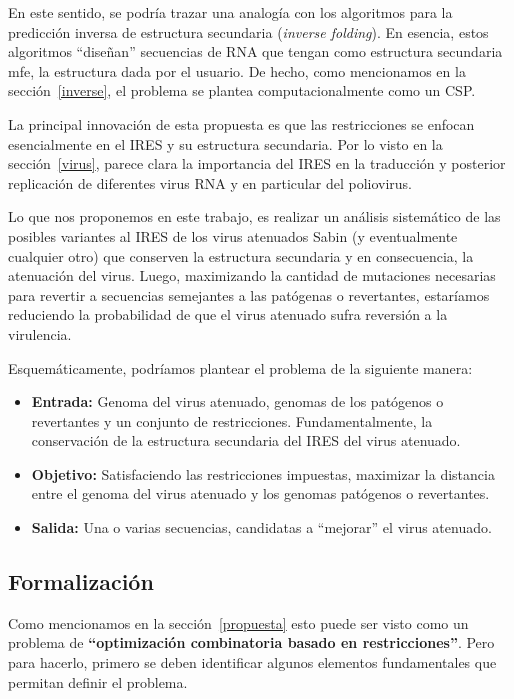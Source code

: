 En este sentido, se podr\'ia trazar una analog\'ia con los algoritmos para la
predicci\'on inversa de estructura secundaria (\textit{inverse folding}). En
esencia, estos algoritmos ``dise\~nan'' secuencias de \ac{RNA} que tengan como
estructura secundaria \ac{mfe}, la estructura dada por el usuario. De hecho,
como mencionamos en la secci\'on~\ref{inverse}, el problema se plantea
computacionalmente como un \ac{CSP}.

La principal innovaci\'on de esta propuesta es que las restricciones se enfocan
esencialmente en el \ac{IRES} y su estructura secundaria. Por lo visto en la
secci\'on~\ref{virus}, parece clara la importancia del \ac{IRES} en la
traducci\'on y posterior replicaci\'on de diferentes virus \ac{RNA} y en
particular del poliovirus.

Lo que nos proponemos en este trabajo, es realizar un an\'alisis sistem\'atico
de las posibles variantes al \ac{IRES} de los virus atenuados  Sabin (y
eventualmente cualquier otro) que conserven la estructura secundaria y
en consecuencia, la atenuaci\'on del virus. Luego, maximizando la cantidad de
mutaciones necesarias para revertir a secuencias semejantes a las pat\'ogenas o
revertantes, estar\'iamos reduciendo la probabilidad de que el virus atenuado
sufra reversi\'on a la virulencia.

Esquem\'aticamente, podr\'iamos plantear el problema de la siguiente manera:
\begin{itemize}
 \item \textbf{Entrada:} Genoma del virus atenuado, genomas de los pat\'ogenos
o revertantes y un conjunto de restricciones. Fundamentalmente, la
conservaci\'on de la estructura secundaria del \ac{IRES} del virus atenuado.
 \item \textbf{Objetivo:} Satisfaciendo las restricciones impuestas, maximizar
la distancia entre el genoma del virus atenuado y los genomas pat\'ogenos o
revertantes.
 \item \textbf{Salida:} Una o varias secuencias, candidatas a ``mejorar'' el
virus atenuado.
\end{itemize}

\subsection{Formalizaci\'on}

Como mencionamos en la secci\'on~\ref{propuesta} esto puede ser visto como un
problema de \textbf{``optimizaci\'on combinatoria basado en restricciones''}.
Pero para hacerlo, primero se deben identificar algunos elementos fundamentales
que permitan definir el problema.

